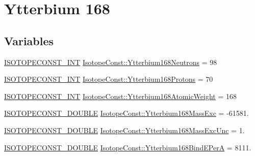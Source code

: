 \hypertarget{group___isotope_const-_ytterbium-_yb168}{}\section{Ytterbium 168}
\label{group___isotope_const-_ytterbium-_yb168}
\subsection*{Variables}
\begin{DoxyCompactItemize}
\item 
\mbox{\hyperlink{group___isotope_const-_macros_ga5f18360b3e99483a35c32d789e62621c}{I\+S\+O\+T\+O\+P\+E\+C\+O\+N\+S\+T\+\_\+\+I\+NT}} \mbox{\hyperlink{group___isotope_const-_ytterbium-_yb168_ga2d826da914d4c5ddce5bf2aa70d0f75c}{Isotope\+Const\+::\+Ytterbium168\+Neutrons}} = 98
\item 
\mbox{\hyperlink{group___isotope_const-_macros_ga5f18360b3e99483a35c32d789e62621c}{I\+S\+O\+T\+O\+P\+E\+C\+O\+N\+S\+T\+\_\+\+I\+NT}} \mbox{\hyperlink{group___isotope_const-_ytterbium-_yb168_ga3d973d7e8c9abfe5e618fba172ca2260}{Isotope\+Const\+::\+Ytterbium168\+Protons}} = 70
\item 
\mbox{\hyperlink{group___isotope_const-_macros_ga5f18360b3e99483a35c32d789e62621c}{I\+S\+O\+T\+O\+P\+E\+C\+O\+N\+S\+T\+\_\+\+I\+NT}} \mbox{\hyperlink{group___isotope_const-_ytterbium-_yb168_ga64d4c18e8f0d9437df5a52ebafdc637f}{Isotope\+Const\+::\+Ytterbium168\+Atomic\+Weight}} = 168
\item 
\mbox{\hyperlink{group___isotope_const-_macros_ga8f45a7272ce02c0b4c65c44636ed719a}{I\+S\+O\+T\+O\+P\+E\+C\+O\+N\+S\+T\+\_\+\+D\+O\+U\+B\+LE}} \mbox{\hyperlink{group___isotope_const-_ytterbium-_yb168_ga68a936640a1fb551f8d7659f51902506}{Isotope\+Const\+::\+Ytterbium168\+Mass\+Exc}} = -\/61581.
\item 
\mbox{\hyperlink{group___isotope_const-_macros_ga8f45a7272ce02c0b4c65c44636ed719a}{I\+S\+O\+T\+O\+P\+E\+C\+O\+N\+S\+T\+\_\+\+D\+O\+U\+B\+LE}} \mbox{\hyperlink{group___isotope_const-_ytterbium-_yb168_ga4c8df7cba8f6c9eccde7430824f9142c}{Isotope\+Const\+::\+Ytterbium168\+Mass\+Exc\+Unc}} = 1.
\item 
\mbox{\hyperlink{group___isotope_const-_macros_ga8f45a7272ce02c0b4c65c44636ed719a}{I\+S\+O\+T\+O\+P\+E\+C\+O\+N\+S\+T\+\_\+\+D\+O\+U\+B\+LE}} \mbox{\hyperlink{group___isotope_const-_ytterbium-_yb168_gad478973586d636778d1cf3157ab5bcdb}{Isotope\+Const\+::\+Ytterbium168\+Bind\+E\+PerA}} = 8111.
\item 

\end{DoxyCompactItemize}
